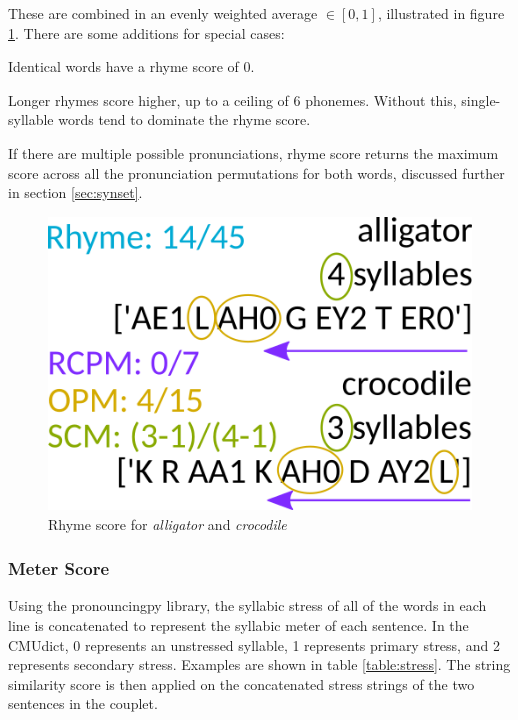 \documentclass[11pt,a4paper]{article}
\newenvironment{tight_enumerate}{
\begin{enumerate}
\setlength{\itemsep}{0pt}
\setlength{\parskip}{0pt}
}{\end{enumerate}}
\begin{document}
These are combined in an evenly weighted average $\in [0, 1]$, illustrated in figure \ref{fig:rhymescore}. There are some additions for special cases:
\begin{tight_enumerate}
	\vspace{-0.5em}
	\item
		Identical words have a rhyme score of 0.
	\item
		Longer rhymes score higher, up to a ceiling of 6 phonemes. Without this, single-syllable words tend to dominate the rhyme score.
	\item
		If there are multiple possible pronunciations, rhyme score returns the maximum score across all the pronunciation permutations for both words, discussed further in section \ref{sec:synset}.
\end{tight_enumerate}

\begin{figure}[h]
    \centering
    \includegraphics[scale=0.45]{rhyme_score.png}
    \caption{Rhyme score for \textit{alligator} and \textit{crocodile}}
    \label{fig:rhymescore}
\end{figure}

\subsubsection{Meter Score}
\label{sec:stressscore}

Using the pronouncingpy library, the syllabic stress of all of the words in each line is concatenated to represent the syllabic meter \cite{meter_def} of each sentence. In the CMUdict, 0 represents an unstressed syllable, 1 represents primary stress, and 2 represents secondary stress.  Examples are shown in table \ref{table:stress}. The \citet{ratcliff} string similarity score is then applied on the concatenated stress strings of the two sentences in the couplet.
\end{document}
